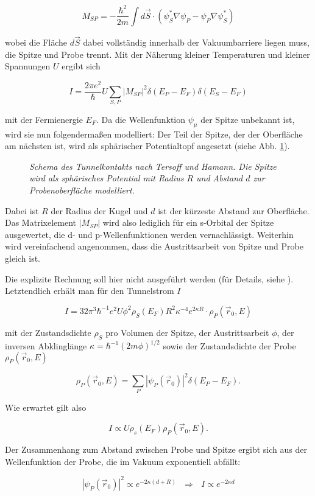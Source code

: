 \[M_{SP}=-\frac{\hbar^2}{2m}\int d\vec{S}\cdot(\psi_{S}^*\nabla\psi_{P} -
\psi_{P}\nabla\psi_{S}^*) \]

wobei die Fläche $d\vec{S}$ dabei vollständig innerhalb der Vakuumbarriere liegen muss, die
Spitze und Probe trennt. Mit der Näherung kleiner Temperaturen und kleiner Spannungen $U$ ergibt
sich

\[I=\frac{2\pi e^2}{\hbar}U\sum_{S,P}|M_{SP}|^2\delta(E_{P}-E_{F}) \delta(E_{S}-E_{F})\]

mit der Fermienergie $E_F$. Da die Wellenfunktion $\psi_{\mu}$ der Spitze unbekannt ist, wird sie
nun folgendermaßen modelliert: Der Teil der Spitze, der der Oberfläche am nächsten ist, wird als
sphärischer Potentialtopf angesetzt (siehe Abb. \ref{spitze}). 
\begin{figure}[htbp]
\centering
\sffamily 

\caption{\textit{Schema des Tunnelkontakts nach Tersoff und Hamann. Die Spitze wird als sphärisches
Potential mit Radius $R$ und Abstand $d$ zur Probenoberfläche modelliert.}}
\label{spitze}
\end{figure}
Dabei ist $R$ der Radius der Kugel
und $d$ ist der kürzeste Abstand zur Oberfläche. Das Matrixelement $|M_{SP}|$ wird
also lediglich für ein s-Orbital der Spitze ausgewertet, die d- und p-Wellenfunktionen werden
vernachlässigt. Weiterhin wird vereinfachend angenommen, dass die Austrittsarbeit von Spitze und
Probe gleich ist.
 
 Die explizite Rechnung soll hier nicht ausgeführt werden (für Details, siehe \cite{Ter83}).
 Letztendlich erhält man für den Tunnelstrom $I$
 
 \[I=32\pi^3\hbar^{-1}e^2U\phi^2\rho_{S}(E_F)R^2\kappa^{-4}e^{2\kappa
 R}\cdot\rho_P(\vec{r}_0, E)\]
 
 mit der Zustandsdichte $\rho_{S}$ pro Volumen der Spitze, der Austrittsarbeit $\phi$, der inversen
 Abklinglänge $\kappa=\hbar^{-1}(2m\phi)^{1/2}$ sowie der Zustandsdichte der Probe
 $\rho_P(\vec{r}_0, E)$
 
 \[\rho_P(\vec{r}_0, E)=\sum_{P}|\psi_{P}(\vec{r}_0)|^2\delta(E_{P}-E_F).\]
 
 Wie erwartet gilt also
 
 \[I\propto U \rho_{s}(E_F) \rho_P(\vec{r}_0, E).\]
 
 Der Zusammenhang zum Abstand zwischen Probe und Spitze ergibt sich aus der
 Wellenfunktion der Probe, die im Vakuum exponentiell abfällt:
 
 \[|\psi_P(\vec{r}_0)|^2\propto e^{-2\kappa(d+R)}~~~\Rightarrow~~~I\propto e^{-2\kappa d}\]
 
